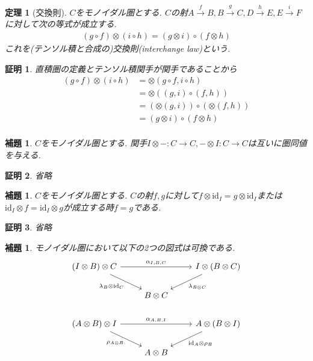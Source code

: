 \documentclass[a4paper,12pt]{ltjsarticle}
\theoremstyle{break}
\newtheorem{lem}[thm]{補題}
\newtheorem{thrm}[thm]{定理}
\newtheorem*{prf}{証明}
\newcommand{\xr}[1]{\xrightarrow{#1}}
\newcommand{\id}{\mathrm{id}}
\newcommand{\ci}{\circ}
\newcommand{\al}{\alpha}
\newcommand{\la}{\lambda}
\newcommand{\ot}{\otimes}
\numberwithin{equation}{section}
\begin{document}
\begin{thrm}[交換則]
  $C$をモノイダル圏とする. $C$の射$A \xr{f} B, B \xr{g} C, D \xr{h} E, E \xr{i} F$に対して次の等式が成立する. 
  \begin{align*}
    (g \ci f) \ot (i \ci h) = (g \ot i) \ci (f \ot h)
  \end{align*}
  これを(テンソル積と合成の)交換則(interchange law)という. 
\end{thrm}

\begin{prf}
  直積圏の定義とテンソル積関手が関手であることから
  \begin{align*}
    (g \ci f) \ot (i \ci h)
    &= \ot(g \ci f, i \ci h) \\
    &= \ot((g,i) \ci (f,h)) \\
    &= (\ot(g,i)) \ci (\ot(f,h)) \\
    &= (g \ot i) \ci (f \ot h) \\
  \end{align*}
\end{prf}

\begin{lem}
  $C$をモノイダル圏とする. 
  関手$I \ot -: C \to C, - \ot I: C \to C$は互いに圏同値を与える. 
\end{lem}

\begin{prf}
  省略
\end{prf}

\begin{lem}
  $C$をモノイダル圏とする. 
  $C$の射$f,g$に対して$f \ot \id_I=g \ot \id_I$または$\id_I \ot f=\id_I \ot g$が成立する時$f=g$である. 
\end{lem}

\begin{prf}
  省略
\end{prf}

\begin{lem}
  モノイダル圏において以下の2つの図式は可換である. 
  \[\begin{tikzcd}
    {(I \ot B) \ot C} && {I \ot (B \ot C)} \\
    & {B \ot C} \\
    {(A \ot B) \ot I} && {A \ot (B \ot I)} \\
    & {A \ot B}
    \arrow["{\al_{I,B,C}}", from=1-1, to=1-3]
    \arrow["{\la_B \ot \id_C}"', from=1-1, to=2-2]
    \arrow["{\al_{A,B,I}}", from=3-1, to=3-3]
    \arrow["{\id_A \ot \rho_B}", from=3-3, to=4-2]
    \arrow["{\rho_{A \ot B}}"', from=3-1, to=4-2]
    \arrow["{\la_{B \ot C}}", from=1-3, to=2-2]
  \end{tikzcd}\]
\end{lem}
\end{document}
